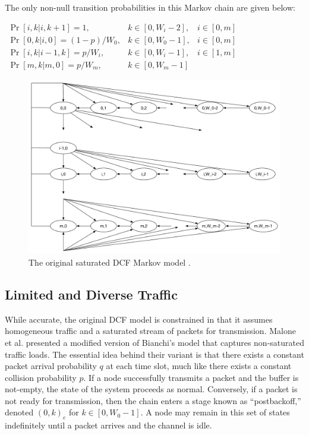 \documentclass{llncs}
\begin{document}
The only non-null transition probabilities in this Markov chain are given below:

\begin{center}
\begin{math}
\boxed{
\begin{array}{lll}
\Pr[i,k | i, k + 1] = 1, & k \in [0, W_i - 2], & i \in [0,m] \\
\Pr[0,k | i, 0] = (1-p)/W_0, & k \in [0, W_0 - 1], & i \in [0,m] \\
\Pr[i,k | i-1, k] = p/W_i, & k \in [0, W_i - 1], & i \in [1,m] \\
\Pr[m,k | m,0] = p/W_m, & k \in [0, W_m - 1] & ~
\end{array}
}
\end{math}
\end{center}

\begin{figure}
\begin{center}
\includegraphics[scale=0.35]{../../sketches/dcf_model.pdf}
\caption{The original saturated DCF Markov model \cite{dcf}.}
\label{fig:dcf_model}
\end{center}
\end{figure}

\subsection{Limited and Diverse Traffic} \label{sec:nonsaturated}
While accurate, the original DCF model is constrained in that it assumes homogeneous traffic and a saturated stream of packets for transmission. Malone et al. \cite{dcf-nonsaturated} presented a modified version of Bianchi's model that captures non-saturated traffic loads. The essential idea behind their variant is that there exists a constant packet arrival probability $q$ at each time slot, much like there exists a constant collision probability $p$. If a node successfully transmits a packet and the buffer is not-empty, the state of the system proceeds as normal. Conversely, if a packet is not ready for transmission, then the chain enters a stage known as ``postbackoff,'' denoted $(0,k)_e$ for $k \in [0, W_0-1]$. A node may remain in this set of states indefinitely until a packet arrives and the channel is idle.
\end{document}
